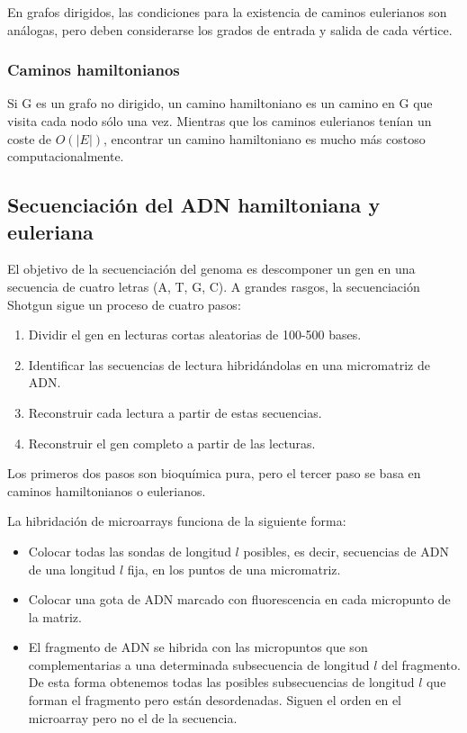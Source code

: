En grafos dirigidos, las condiciones para la existencia de caminos eulerianos son análogas, pero deben considerarse los grados de entrada y salida de cada vértice.

\subsubsection{Caminos hamiltonianos}
Si G es un grafo no dirigido, un camino hamiltoniano es un camino en G que visita cada nodo sólo una vez. Mientras que los caminos eulerianos tenían un coste de $O(|E|)$, encontrar un camino hamiltoniano es mucho más costoso computacionalmente. 

\subsection{Secuenciación del ADN hamiltoniana y euleriana}
El objetivo de la secuenciación del genoma es descomponer un gen en una secuencia de cuatro letras (A, T, G, C). 
A grandes rasgos, la secuenciación Shotgun sigue un proceso de cuatro pasos:
\begin{enumerate}
\item Dividir el gen en lecturas cortas aleatorias de 100-500 bases.
\item Identificar las secuencias de lectura hibridándolas en una micromatriz de ADN.
\item Reconstruir cada lectura a partir de estas secuencias.
\item Reconstruir el gen completo a partir de las lecturas.
\end{enumerate}
Los primeros dos pasos son bioquímica pura, pero el tercer paso se basa en caminos hamiltonianos o eulerianos. 

La hibridación de microarrays funciona de la siguiente forma:
\begin{itemize}
\item Colocar todas las sondas de longitud $l$ posibles, es decir, secuencias de ADN de una longitud $l$ fija, en los puntos de una micromatriz.
\item Colocar una gota de ADN marcado con fluorescencia en cada micropunto de la matriz.
\item El fragmento de ADN se hibrida con las micropuntos que son complementarias a una determinada subsecuencia de longitud $l$ del fragmento. De esta forma obtenemos todas las posibles subsecuencias de longitud $l$ que forman el fragmento pero están desordenadas. Siguen el orden en el microarray pero no el de la secuencia.
\end{itemize}


